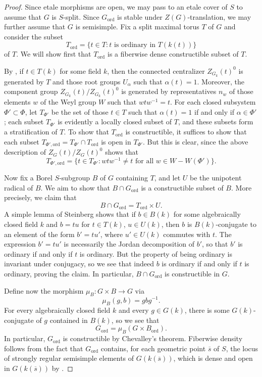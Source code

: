 \documentclass[11pt,reqno]{amsart}
\theoremstyle{definition}
\renewcommand{\rm}{\mathrm}
\begin{document}
\begin{proof}
Since etale morphisms are open, we may pass to an etale cover of $S$ to assume that $G$ is $S$-split. Since $G_{\rm{ord}}$ is stable under $Z(G)$-translation, we may further assume that $G$ is semisimple. Fix a split maximal torus $T$ of $G$ and consider the subset
\[
T_{\rm{ord}} = \{t \in T: t \text{ is ordinary in } T(k(t))\}
\]
of $T$. We will show first that $T_{\rm{ord}}$ is a fiberwise dense constructible subset of $T$. \smallskip

By \cite[Lem.\ 2.14]{SteinbergTorsion}, if $t \in T(k)$ for some field $k$, then the connected centralizer $Z_{G_k}(t)^0$ is generated by $T$ and those root groups $U_\alpha$ such that $\alpha(t) = 1$. Moreover, the component group $Z_{G_k}(t)/Z_{G_k}(t)^0$ is generated by representatives $n_w$ of those elements $w$ of the Weyl group $W$ such that $wtw^{-1} = t$. For each closed subsystem $\Phi' \subset \Phi$, let $T_{\Phi'}$ be the set of those $t \in T$ such that $\alpha(t) = 1$ if and only if $\alpha \in \Phi'$; each subset $T_{\Phi'}$ is evidently a locally closed subset of $T$, and these subsets form a stratification of $T$. To show that $T_{\rm{ord}}$ is constructible, it suffices to show that each subset $T_{\Phi', \rm{ord}} = T_{\Phi'} \cap T_{\rm{ord}}$ is open in $T_{\Phi'}$. But this is clear, since the above description of $Z_G(t)/Z_G(t)^0$ shows that
\[
T_{\Phi', \rm{ord}} = \{t \in T_{\Phi'}: wtw^{-1} \neq t \text{ for all } w \in W - W(\Phi')\}.
\]

Now fix a Borel $S$-subgroup $B$ of $G$ containing $T$, and let $U$ be the unipotent radical of $B$. We aim to show that $B \cap G_{\rm{ord}}$ is a constructible subset of $B$. More precisely, we claim that
\[
B \cap G_{\rm{ord}} = T_{\rm{ord}} \times U.
\]
A simple lemma of Steinberg \cite[Lem.\ 2.12]{SteinbergReg} shows that if $b \in B(k)$ for some algebraically closed field $k$ and $b = tu$ for $t \in T(k)$, $u \in U(k)$, then $b$ is $B(k)$-conjugate to an element of the form $b' = tu'$, where $u' \in U(k)$ commutes with $t$. The expression $b' = tu'$ is necessarily the Jordan decomposition of $b'$, so that $b'$ is ordinary if and only if $t$ is ordinary. But the property of being ordinary is invariant under conjugacy, so we see that indeed $b$ is ordinary if and only if $t$ is ordinary, proving the claim. In particular, $B \cap G_{\rm{ord}}$ is constructible in $G$. \smallskip

Define now the morphism $\mu_B: G \times B \to G$ via
\[
\mu_B(g, b) = gbg^{-1}.
\]
For every algebraically closed field $k$ and every $g \in G(k)$, there is some $G(k)$-conjugate of $g$ contained in $B(k)$, so we see that
\[
G_{\rm{ord}} = \mu_B(G \times B_{\rm{ord}}).
\]
In particular, $G_{\rm{ord}}$ is constructible by Chevalley's theorem. Fiberwise density follows from the fact that $G_{\rm{ord}}$ contains, for each geometric point $\overline{s}$ of $S$, the locus of strongly regular semisimple elements of $G(k(\overline{s}))$, which is dense and open in $G(k(\overline{s}))$ by \cite[2.15]{SteinbergReg}.
\end{proof}
\end{document}
